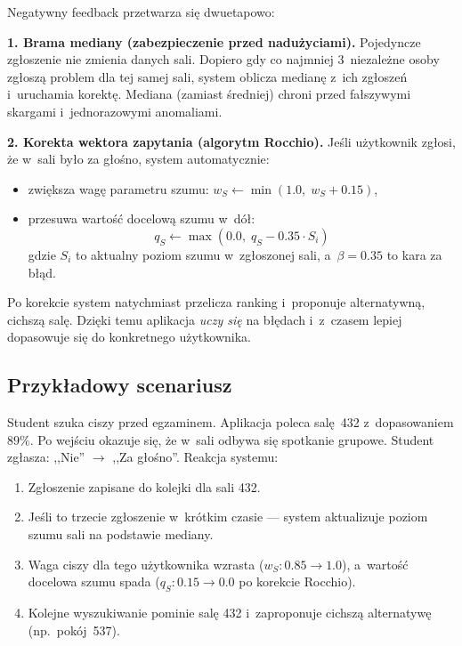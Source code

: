 \documentclass[14pt,a4paper]{extarticle}
\begin{document}
Negatywny feedback przetwarza się dwuetapowo:

\textbf{1. Brama mediany (zabezpieczenie przed nadużyciami).} Pojedyncze zgłoszenie nie zmienia danych sali. Dopiero gdy co najmniej 3~niezależne osoby zgłoszą problem dla tej samej sali, system oblicza medianę z~ich zgłoszeń i~uruchamia korektę. Mediana (zamiast średniej) chroni przed fałszywymi skargami i~jednorazowymi anomaliami.

\textbf{2. Korekta wektora zapytania (algorytm Rocchio).} Jeśli użytkownik zgłosi, że w~sali było za głośno, system automatycznie:
\begin{itemize}
    \item zwiększa wagę parametru szumu: $w_S \leftarrow \min(1.0,\; w_S + 0.15)$,
    \item przesuwa wartość docelową szumu w~dół:
    \begin{equation}
        q_S \leftarrow \max(0.0,\; q_S - 0.35 \cdot S_i)
    \end{equation}
    gdzie $S_i$ to aktualny poziom szumu w~zgłoszonej sali, a~$\beta = 0.35$ to kara za błąd.
\end{itemize}

Po korekcie system natychmiast przelicza ranking i~proponuje alternatywną, cichszą salę. Dzięki temu aplikacja \emph{uczy się} na błędach i~z~czasem lepiej dopasowuje się do konkretnego użytkownika.

\subsection{Przykładowy scenariusz}

Student szuka ciszy przed egzaminem. Aplikacja poleca salę~432 z~dopasowaniem $89\%$. Po wejściu okazuje się, że w~sali odbywa się spotkanie grupowe. Student zgłasza: ,,Nie'' $\rightarrow$ ,,Za głośno''. Reakcja systemu:
\begin{enumerate}
    \item Zgłoszenie zapisane do kolejki dla sali 432.
    \item Jeśli to trzecie zgłoszenie w~krótkim czasie --- system aktualizuje poziom szumu sali na podstawie mediany.
    \item Waga ciszy dla tego użytkownika wzrasta ($w_S: 0.85 \rightarrow 1.0$), a~wartość docelowa szumu spada ($q_S: 0.15 \rightarrow 0.0$ po korekcie Rocchio).
    \item Kolejne wyszukiwanie pominie salę 432 i~zaproponuje cichszą alternatywę (np.~pokój~537).
\end{enumerate}
\end{document}
